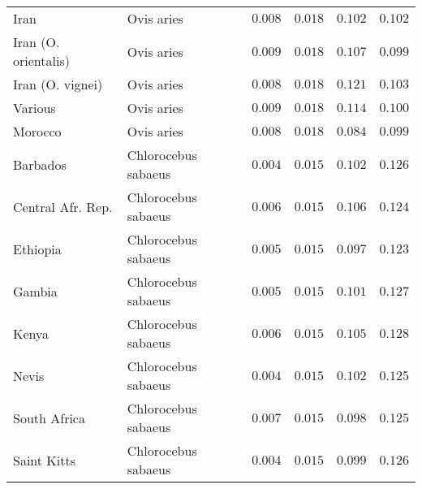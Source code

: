 \documentclass{article}
\begin{document}
\begin{center}
\begin{longtable}{|l|l|r|r|r|r|}
            Iran                 & Ovis aries          & $ 0.008$              & $ 0.018$                & $ 0.102$                 & $ 0.102$                \\
            Iran (O. orientalis) & Ovis aries          & $ 0.009$              & $ 0.018$                & $ 0.107$                 & $ 0.099$                \\
            Iran (O. vignei)     & Ovis aries          & $ 0.008$              & $ 0.018$                & $ 0.121$                 & $ 0.103$                \\
            Various              & Ovis aries          & $ 0.009$              & $ 0.018$                & $ 0.114$                 & $ 0.100$                \\
            Morocco              & Ovis aries          & $ 0.008$              & $ 0.018$                & $ 0.084$                 & $ 0.099$                \\
            Barbados             & Chlorocebus sabaeus & $ 0.004$              & $ 0.015$                & $ 0.102$                 & $ 0.126$                \\
            Central Afr. Rep.    & Chlorocebus sabaeus & $ 0.006$              & $ 0.015$                & $ 0.106$                 & $ 0.124$                \\
            Ethiopia             & Chlorocebus sabaeus & $ 0.005$              & $ 0.015$                & $ 0.097$                 & $ 0.123$                \\
            Gambia               & Chlorocebus sabaeus & $ 0.005$              & $ 0.015$                & $ 0.101$                 & $ 0.127$                \\
            Kenya                & Chlorocebus sabaeus & $ 0.006$              & $ 0.015$                & $ 0.105$                 & $ 0.128$                \\
            Nevis                & Chlorocebus sabaeus & $ 0.004$              & $ 0.015$                & $ 0.102$                 & $ 0.125$                \\
            South Africa         & Chlorocebus sabaeus & $ 0.007$              & $ 0.015$                & $ 0.098$                 & $ 0.125$                \\
            Saint Kitts          & Chlorocebus sabaeus & $ 0.004$              & $ 0.015$                & $ 0.099$                 & $ 0.126$                \\

\end{longtable}
\end{center}
\end{document}
